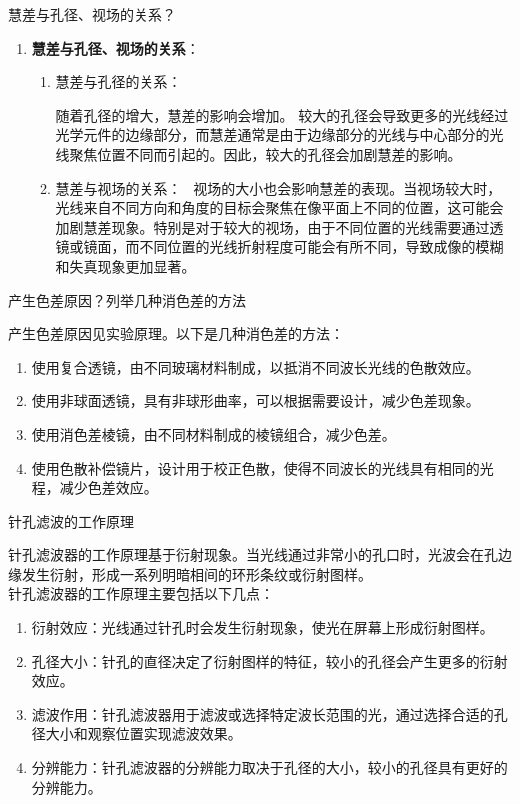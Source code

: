 \documentclass[dvipsnames, svgnames,a4paper,11pt]{article}
\begin{document}
	\begin{question}
		慧差与孔径、视场的关系？
	\end{question}
	\begin{enumerate}
		\item \textbf{慧差与孔径、视场的关系}：
		\begin{enumerate}
			\item 慧差与孔径的关系：
		
				随着孔径的增大，慧差的影响会增加。
				较大的孔径会导致更多的光线经过光学元件的边缘部分，而慧差通常是由于边缘部分的光线与中心部分的光线聚焦位置不同而引起的。因此，较大的孔径会加剧慧差的影响。
			
			
			\item 慧差与视场的关系：
			\
				视场的大小也会影响慧差的表现。当视场较大时，光线来自不同方向和角度的目标会聚焦在像平面上不同的位置，这可能会加剧慧差现象。特别是对于较大的视场，由于不同位置的光线需要通过透镜或镜面，而不同位置的光线折射程度可能会有所不同，导致成像的模糊和失真现象更加显著。
			
		\end{enumerate}
	\end{enumerate}
	
	\begin{question}
			产生色差原因？列举几种消色差的方法
	\end{question}
	产生色差原因见实验原理。以下是几种消色差的方法：
\begin{enumerate}
    \item 使用复合透镜，由不同玻璃材料制成，以抵消不同波长光线的色散效应。
    \item 使用非球面透镜，具有非球形曲率，可以根据需要设计，减少色差现象。
    \item 使用消色差棱镜，由不同材料制成的棱镜组合，减少色差。
    \item 使用色散补偿镜片，设计用于校正色散，使得不同波长的光线具有相同的光程，减少色差效应。
\end{enumerate}
	\begin{question}
		针孔滤波的工作原理
	\end{question}
	针孔滤波器的工作原理基于衍射现象。当光线通过非常小的孔口时，光波会在孔边缘发生衍射，形成一系列明暗相间的环形条纹或衍射图样。\\

针孔滤波器的工作原理主要包括以下几点：
\begin{enumerate}
    \item 衍射效应：光线通过针孔时会发生衍射现象，使光在屏幕上形成衍射图样。
    \item 孔径大小：针孔的直径决定了衍射图样的特征，较小的孔径会产生更多的衍射效应。
    \item 滤波作用：针孔滤波器用于滤波或选择特定波长范围的光，通过选择合适的孔径大小和观察位置实现滤波效果。
    \item 分辨能力：针孔滤波器的分辨能力取决于孔径的大小，较小的孔径具有更好的分辨能力。
\end{enumerate}
\end{document}
